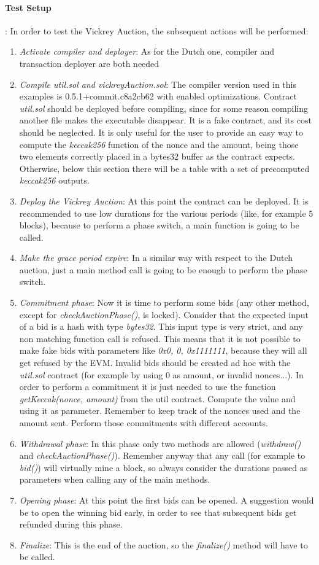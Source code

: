 \documentclass[11pt, a4paper]{report}
\begin{document}
	\paragraph*{Test Setup}: In order to test the Vickrey Auction, the subsequent actions will be performed:
	\begin{enumerate}
		\item \emph{Activate compiler and deployer}: As for the Dutch one, compiler and transaction deployer are both needed
		\item \emph{Compile util.sol and vickreyAuction.sol}: The compiler version used in this examples is 0.5.1+commit.c8a2cb62 with enabled optimizations. Contract \emph{util.sol} should be deployed before compiling, since for some reason compiling another file makes the executable disappear. It is a fake contract, and its cost should be neglected. It is only useful for the user to provide an easy way to compute the \emph{keccak256} function of the nonce and the amount, being those two elements correctly placed in a bytes32 buffer as the contract expects. Otherwise, below this section there will be a table with a set of precomputed \emph{keccak256} outputs.
		\item \emph{Deploy the Vickrey Auction}: At this point the contract can be deployed. It is recommended to use low durations for the various periods (like, for example 5 blocks), because to perform a phase switch, a main function is going to be called.
		\item \emph{Make the grace period expire}: In a similar way with respect to the Dutch auction, just a main method call is going to be enough to perform the phase switch.
		\item \emph{Commitment phase}: Now it is time to perform some bids (any other method, except for \emph{checkAuctionPhase()}, is locked). Consider that the expected input of a bid is a hash with type \emph{bytes32}. This input type is very strict, and any non matching function call is refused. This means that it is not possible to make fake bids with parameters like \emph{0x0, 0, 0x1111111}, because they will all get refused by the EVM. Invalid bids should be created ad hoc with the \emph{util.sol} contract (for example by using 0 as amount, or invalid nonces...).
		In order to perform a commitment it is just needed to use the function \emph{getKeccak(nonce, amount)} from the util contract. Compute the value and using it as parameter. Remember to keep track of the nonces used and the amount sent. Perform those commitments with different accounts.
		\item \emph{Withdrawal phase}: In this phase only two methods are allowed (\emph{withdraw()} and \emph{checkAuctionPhase()}). Remember anyway that any call (for example to \emph{bid()}) will virtually mine a block, so always consider the durations passed as parameters when calling any of the main methods.
		\item \emph{Opening phase}: At this point the first bids can be opened. A suggestion would be to open the winning bid early, in order to see that subsequent bids get refunded during this phase.
		\item \emph{Finalize}: This is the end of the auction, so the \emph{finalize()} method will have to be called.
	\end{enumerate}
\end{document}
